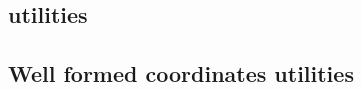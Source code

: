 \subsection{\wcpMod{} utilities}                    \label{bls: wcp utilities}                           
\subsection{Well formed coordinates utilities}      \label{bls: well formed coordinates utilities}       
